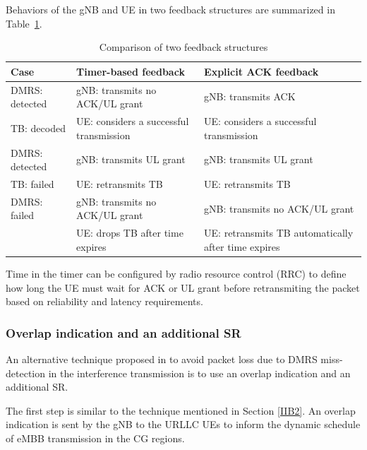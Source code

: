 \documentclass{ieeeaccess}
\begin{document}
Behaviors of the gNB and UE in two feedback structures are summarized in Table~\ref{tab1}.

\begin{table}[htbp]
\caption{Comparison of two feedback structures}
\begin{center}
\begin{tabular}{|p{8em}|p{8em}|p{8em}|}
 \hline
 \textbf{Case} & \textbf{Timer-based feedback}&\textbf{Explicit ACK feedback}\\
 \hline
 DMRS: detected&gNB: transmits no ACK/UL grant&gNB: transmits ACK\\TB: decoded &UE: considers a successful transmission &UE: considers a successful transmission\\
 \hline
  DMRS: detected&gNB: transmits UL grant &gNB: transmits UL grant\\TB: failed & UE: retransmits TB&UE: retransmits TB\\
 \hline
DMRS: failed&gNB: transmits no ACK/UL grant&gNB: transmits no ACK/UL grant\\ &UE: drops TB after time expires& UE: retransmits TB automatically after time expires\\

 
 \hline
\end{tabular}
\label{tab1}
\end{center}
\vspace{-5mm}
\end{table}

Time in the timer can be configured by radio resource control (RRC) to define how long the UE must wait for ACK or UL grant before retransmiting the packet based on reliability and latency requirements.

\subsubsection{Overlap indication and an additional SR}\label{IIB3}


An alternative technique proposed in \cite{ad99} to avoid packet loss due to DMRS miss-detection in the interference transmission is to use an overlap indication and an additional SR.

The first step is similar to the technique mentioned in Section \ref{IIB2}. An overlap indication is sent by the gNB to the URLLC UEs to inform the dynamic schedule of eMBB transmission in the CG regions.
\end{document}
